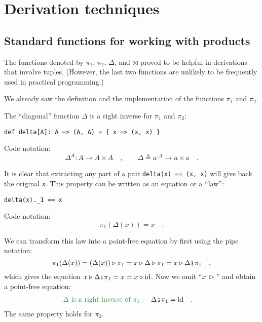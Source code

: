 \section{Derivation techniques}

\subsection{Standard functions for working with products}

The functions denoted by $\pi_{1}$, $\pi_{2}$, $\Delta$, and $\boxtimes$
proved to be helpful in derivations that involve tuples. (However,
the last two functions are unlikely to be frequently used in practical
programming.) 

We already saw the definition and the implementation of the functions
$\pi_{1}$ and $\pi_{2}$. 

The \textsf{``}diagonal\textsf{''} function $\Delta$ is a right inverse for $\pi_{1}$
and $\pi_{2}$:
\begin{lstlisting}
def delta[A]: A => (A, A) = { x => (x, x) }
\end{lstlisting}
Code notation:
\[
\Delta^{A}:A\rightarrow A\times A\quad,\quad\quad\Delta\triangleq a^{:A}\rightarrow a\times a\quad.
\]

It is clear that extracting any part of a pair \lstinline!delta(x) == (x, x)!
will give back the original \lstinline!x!. This property can be written
as an equation or a \textsf{``}law\textsf{''}:
\begin{lstlisting}
delta(x)._1 == x
\end{lstlisting}
Code notation:
\[
\pi_{1}(\Delta(x))=x\quad.
\]

We can transform this law into a point-free equation by first using
the pipe notation:
\[
\pi_{1}(\Delta(x))=(\Delta(x))\triangleright\pi_{1}=x\triangleright\Delta\triangleright\pi_{1}=x\triangleright\Delta\bef\pi_{1}\quad,
\]
which gives the equation $x\triangleright\Delta\bef\pi_{1}=x=x\triangleright\text{id}$.
Now we omit \textsf{``}$x\,\triangleright$\textsf{''} and obtain a point-free equation:
\begin{align}
{\color{greenunder}\Delta\text{ is a right inverse of }\pi_{1}:}\quad & \Delta\bef\pi_{1}=\text{id}\quad.\label{eq:pair-identity-law-left}
\end{align}
The same property holds for $\pi_{2}$.


